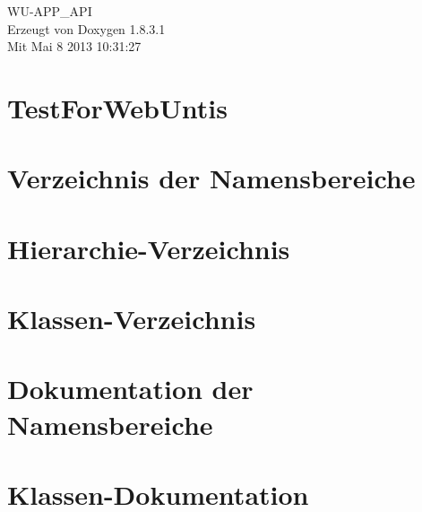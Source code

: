\documentclass{book}
\begin{document}
\hypersetup{pageanchor=false,citecolor=blue}
\begin{titlepage}
\vspace*{7cm}
\begin{center}
{\Large W\-U-\/\-A\-P\-P\-\_\-\-A\-P\-I }\\
\vspace*{1cm}
{\large Erzeugt von Doxygen 1.8.3.1}\\
\vspace*{0.5cm}
{\small Mit Mai 8 2013 10:31:27}\\
\end{center}
\end{titlepage}
\clearemptydoublepage
{}
\tableofcontents
\clearemptydoublepage
{}
\hypersetup{pageanchor=true,citecolor=blue}
\chapter{Test\-For\-Web\-Untis}
\label{md_README}
\hypertarget{md_README}{}

\chapter{Verzeichnis der Namensbereiche}

\chapter{Hierarchie-\/\-Verzeichnis}

\chapter{Klassen-\/\-Verzeichnis}

\chapter{Dokumentation der Namensbereiche}





\chapter{Klassen-\/\-Dokumentation}















\printindex
\end{document}
